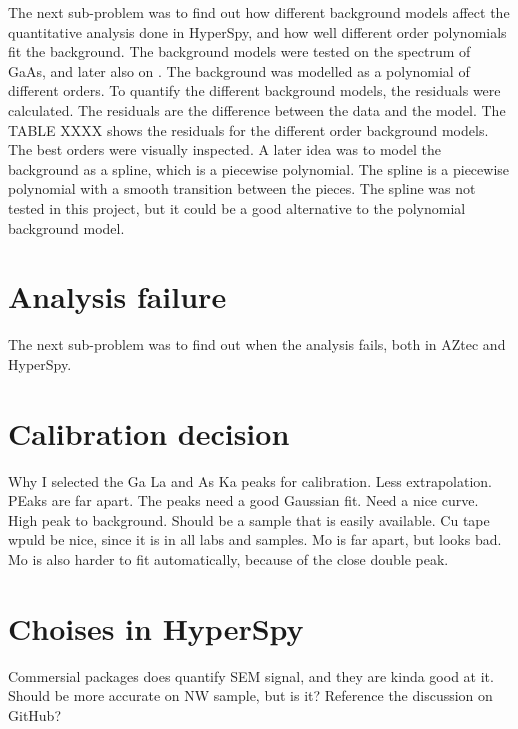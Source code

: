 The next sub-problem was to find out how different background models affect the quantitative analysis done in HyperSpy, and how well different order polynomials fit the background.
The background models were tested on the spectrum of GaAs, and later also on .
The background was modelled as a polynomial of different orders.
To quantify the different background models, the residuals were calculated.
The residuals are the difference between the data and the model.
The TABLE XXXX  shows the residuals for the different order background models.
The best orders were visually inspected.
A later idea was to model the background as a spline, which is a piecewise polynomial.
The spline is a piecewise polynomial with a smooth transition between the pieces.
The spline was not tested in this project, but it could be a good alternative to the polynomial background model.


%
%
\section{Analysis failure}
\label{sec:results:failure}

The next sub-problem was to find out when the analysis fails, both in AZtec and HyperSpy.







\section{Calibration decision}

Why I selected the Ga La and As Ka peaks for calibration.
Less extrapolation. PEaks are far apart.
The peaks need a good Gaussian fit.
Need a nice curve.
High peak to background.
Should be a sample that is easily available. Cu tape wpuld be nice, since it is in all labs and samples.
Mo is far apart, but looks bad.
Mo is also harder to fit automatically, because of the close double peak.



\section{Choises in HyperSpy}

Commersial packages does quantify SEM signal, and they are kinda good at it.
Should be more accurate on NW sample, but is it?
Reference the discussion on GitHub?
